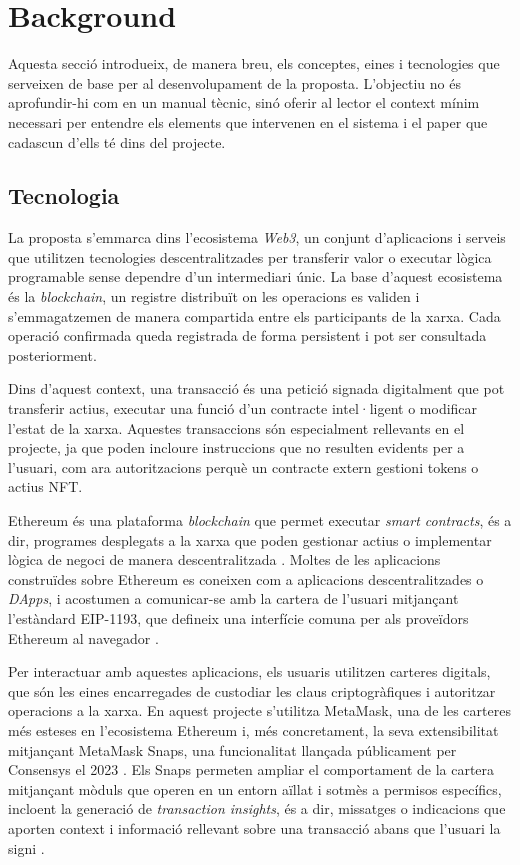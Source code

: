\section{Background}
\label{cap:general_description}

Aquesta secció introdueix, de manera breu, els conceptes, eines i tecnologies que serveixen de base per al desenvolupament de la proposta. L’objectiu no és aprofundir-hi com en un manual tècnic, sinó oferir al lector el context mínim necessari per entendre els elements que intervenen en el sistema i el paper que cadascun d’ells té dins del projecte.

\subsection{Tecnologia}

La proposta s’emmarca dins l’ecosistema \textit{Web3}, un conjunt d’aplicacions i serveis que utilitzen tecnologies descentralitzades per transferir valor o executar lògica programable sense dependre d’un intermediari únic. La base d’aquest ecosistema és la \textit{blockchain}, un registre distribuït on les operacions es validen i s’emmagatzemen de manera compartida entre els participants de la xarxa. Cada operació confirmada queda registrada de forma persistent i pot ser consultada posteriorment.

Dins d’aquest context, una transacció és una petició signada digitalment que pot transferir actius, executar una funció d’un contracte intel·ligent o modificar l’estat de la xarxa. Aquestes transaccions són especialment rellevants en el projecte, ja que poden incloure instruccions que no resulten evidents per a l’usuari, com ara autoritzacions perquè un contracte extern gestioni tokens o actius NFT.

Ethereum és una plataforma \textit{blockchain} que permet executar \textit{smart contracts}, és a dir, programes desplegats a la xarxa que poden gestionar actius o implementar lògica de negoci de manera descentralitzada \cite{ethereum_whitepaper,solidity_docs}. Moltes de les aplicacions construïdes sobre Ethereum es coneixen com a aplicacions descentralitzades o \textit{DApps}, i acostumen a comunicar-se amb la cartera de l’usuari mitjançant l’estàndard EIP-1193, que defineix una interfície comuna per als proveïdors Ethereum al navegador \cite{eip1193}.


Per interactuar amb aquestes aplicacions, els usuaris utilitzen carteres digitals, que són les eines encarregades de custodiar les claus criptogràfiques i autoritzar operacions a la xarxa. En aquest projecte s’utilitza MetaMask, una de les carteres més esteses en l’ecosistema Ethereum i, més concretament, la seva extensibilitat mitjançant MetaMask Snaps, una funcionalitat llançada públicament per Consensys el 2023 \cite{consensys_snaps_launch}. Els Snaps permeten ampliar el comportament de la cartera mitjançant mòduls que operen en un entorn aïllat i sotmès a permisos específics, incloent la generació de \textit{transaction insights}, és a dir, missatges o indicacions que aporten context i informació rellevant sobre una transacció abans que l’usuari la signi \cite{metamask_tx_insights,metamask_entrypoints,metamask_permissions}.

